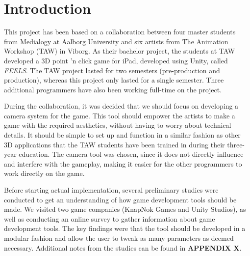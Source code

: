 \section{Introduction}


This project has been based on a collaboration between four master students from Medialogy at Aalborg University and six artists from The Animation Workshop (TAW) in Viborg. As their bachelor project, the students at TAW developed a 3D point 'n click game for iPad, developed using Unity, called \textit{FEELS}. The TAW project lasted for two semesters (pre-production and production), whereas this project only lasted for a single semester. Three additional programmers have also been working full-time on the project.

During the collaboration, it was decided that we should focus on developing a camera system for the game. This tool should empower the artists to make a game with the required aesthetics, without having to worry about technical details. It should be simple to set up and function in a similar fashion as other 3D applications that the TAW students have been trained in during their three-year education. The camera tool was chosen, since it does not directly influence and interfere with the gameplay, making it easier for the other programmers to work directly on the game.

Before starting actual implementation, several preliminary studies were conducted to get an understanding of how game development tools should be made. We visited two game companies (KnapNok Games and Unity Studios), as well as conducting an online survey to gather information about game development tools. The key findings were that the tool should be developed in a modular fashion and allow the user to tweak as many parameters as deemed necessary. Additional notes from the studies can be found in \textbf{APPENDIX X}.